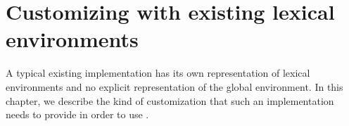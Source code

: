 \chapter{Customizing with existing lexical environments}

A typical existing \commonlisp{} implementation has its own
representation of lexical environments and no explicit representation
of the global environment.  In this chapter, we describe the kind of
customization that such an implementation needs to provide in order to
use \sysname{}.

